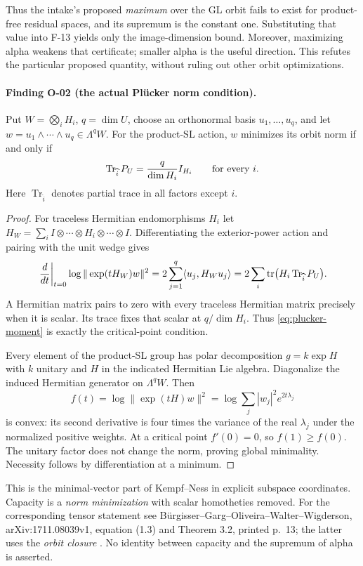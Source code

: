 Thus the intake's proposed \emph{maximum} over the GL orbit
fails to exist for product-free residual spaces, and its
supremum is the constant one. Substituting that value into
F-13 yields only the image-dimension bound. Moreover,
maximizing alpha weakens that certificate; smaller alpha is
the useful direction. This refutes the particular proposed
quantity, without ruling out other orbit optimizations.

\paragraph{Finding O-02 (the actual Pl\"ucker norm condition).}
Put $W=\bigotimes_iH_i$, $q=\dim U$, choose an orthonormal basis
$u_1,\ldots,u_q$, and let
$w=u_1\wedge\cdots\wedge u_q\in\Lambda^q W$. For the product-SL
action, $w$ minimizes its orbit norm if and only if
\begin{equation}\label{eq:plucker-moment}
 \operatorname{Tr}_{\widehat i}P_U={q\over\dim H_i}I_{H_i}
 \qquad\hbox{for every }i.
\end{equation}
Here $\operatorname{Tr}_{\widehat i}$ denotes partial trace
in all factors except $i$.

\begin{proof}
For traceless Hermitian endomorphisms $H_i$ let
$H_W=\sum_i I\otimes\cdots\otimes H_i\otimes\cdots\otimes I$.
Differentiating the exterior-power action and pairing with the
unit wedge gives
\[
 \left.{d\over dt}\right|_{t=0}\log\|\exp(tH_W)w\|^2
 =2\sum_{j=1}^q\langle u_j,H_Wu_j\rangle
 =2\sum_i\operatorname{tr}\bigl(H_i\operatorname{Tr}_{\widehat i}P_U\bigr).
\]
A Hermitian matrix pairs to zero with every traceless Hermitian
matrix precisely when it is scalar. Its trace fixes that
scalar at $q/\dim H_i$. Thus \eqref{eq:plucker-moment} is
exactly the critical-point condition.

Every element of the product-SL group has polar decomposition
$g=k\exp H$ with $k$ unitary and $H$ in the indicated Hermitian
Lie algebra. Diagonalize the induced Hermitian generator on
$\Lambda^q W$. Then
\[
 f(t)=\log\|\exp(tH)w\|^2
     =\log\sum_j |w_j|^2e^{2t\lambda_j}
\]
is convex: its second derivative is four times the variance
of the real $\lambda_j$ under the normalized positive weights.
At a critical point $f'(0)=0$, so $f(1)\geq f(0)$.
The unitary factor does not change the norm, proving global
minimality. Necessity follows by differentiation at a minimum.
\end{proof}

This is the minimal-vector part of Kempf--Ness in explicit
subspace coordinates. Capacity is a \emph{norm minimization}
with scalar homotheties removed. For the corresponding tensor
statement see B\"urgisser--Garg--Oliveira--Walter--Wigderson,
arXiv:1711.08039v1, equation (1.3) and Theorem 3.2, printed p.~13;
the latter uses the \emph{orbit closure} \cite{BGOWW}. No identity between
capacity and the supremum of alpha is asserted.

